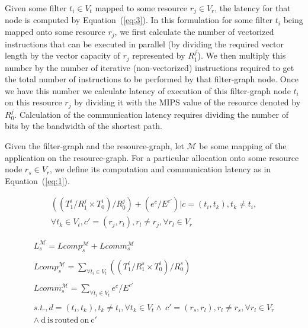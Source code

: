 \documentclass[10pt, conference, compsocconf]{IEEEtran}
\begin{document}
Given some filter $t_i \in V_t$ mapped to some resource $r_j \in V_r$,
the latency for that node is computed by Equation~(\ref{eq:3}). In this
formulation for some filter $t_i$ being mapped onto some resource $r_j$,
we first calculate the number of vectorized instructions that can be
executed in parallel (by dividing the required vector length by the
vector capacity of $r_j$ represented by $R^j_1$). We then multiply this
number by the number of iterative (non-vectorized) instructions required
to get the total number of instructions to be performed by that
filter-graph node. Once we have this number we calculate latency of
execution of this filter-graph node $t_i$ on this resource $r_j$ by
dividing it with the MIPS value of the resource denoted by
$R^j_0$. Calculation of the communication latency requires dividing the
number of bits by the bandwidth of the shortest path.

Given the filter-graph and the resource-graph, let $\mathcal{M}$ be some
mapping of the application on the resource-graph. For a particular
allocation onto some resource node $r_s \in V_r$, we define its
computation and communication latency as in Equation~(\ref{eq:1}).


\begin{scriptsize}
\begin{equation}
  \label{eq:3}
  \begin{array}{c}
    ((T^i_1/R^j_1\times T^i_0)/R^j_0)
    + (e^c/E^{c'}) | c = (t_i,t_k), t_k \neq t_i, \\ \forall t_k \in V_t, c' =
    (r_j,r_l), r_l \neq r_j, \forall r_l \in V_r
  \end{array}
\end{equation}
\end{scriptsize}

\begin{figure}[h!]
\begin{scriptsize}
\begin{equation}
  \begin{array}{c}
    L^{\mathcal{M}}_s = Lcomp^{\mathcal{M}}_s +
    Lcomm^{\mathcal{M}}_s\\
    \\Lcomp^{\mathcal{M}}_s =
    \sum_{\forall t_i \in V_t} ((T^i_1/R^s_1\times T^i_0)/R^s_0)\\
    \\Lcomm^{\mathcal{M}}_s =
    \sum_{\forall t_i \in V_t} e^c / E^{c'}\\
    \\s.t., d = (t_i,t_k), t_k \neq t_i, \forall t_k
    \in V_t \wedge\  c' = (r_s,r_l), r_l \neq r_s, \forall r_l \in V_r \\
    \wedge\ \mathrm{d\ is\ routed\ on\ c'}
  \end{array}
  \label{eq:1}
\end{equation}
\end{scriptsize}
\end{figure}
\end{document}
